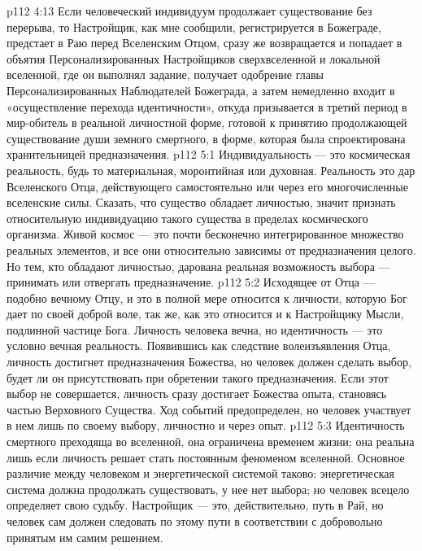 \vs p112 4:13 Если человеческий индивидуум продолжает существование без перерыва, то Настройщик, как мне сообщили, регистрируется в Божеграде, предстает в Раю перед Вселенским Отцом, сразу же возвращается и попадает в объятия Персонализированных Настройщиков сверхвселенной и локальной вселенной, где он выполнял задание, получает одобрение главы Персонализированных Наблюдателей Божеграда, а затем немедленно входит в «осуществление перехода идентичности», откуда призывается в третий период в мир\hyp{}обитель в реальной личностной форме, готовой к принятию продолжающей существование души земного смертного, в форме, которая была спроектирована хранительницей предназначения.
\vs p112 5:1 Индивидуальность --- это космическая реальность, будь то материальная, моронтийная или духовная. Реальность  это дар Вселенского Отца, действующего самостоятельно или через его многочисленные вселенские силы. Сказать, что существо обладает личностью, значит признать относительную индивидуацию такого существа в пределах космического организма. Живой космос --- это почти бесконечно интегрированное множество реальных элементов, и все они относительно зависимы от предназначения целого. Но тем, кто обладают личностью, дарована реальная возможность выбора --- принимать или отвергать предназначение.
\vs p112 5:2 Исходящее от Отца --- подобно вечному Отцу, и это в полной мере относится к личности, которую Бог дает по своей доброй воле, так же, как это относится и к Настройщику Мысли, подлинной частице Бога. Личность человека вечна, но идентичность --- это условно вечная реальность. Появившись как следствие волеизъявления Отца, личность достигнет предназначения Божества, но человек должен сделать выбор, будет ли он присутствовать при обретении такого предназначения. Если этот выбор не совершается, личность сразу достигает Божества опыта, становясь частью Верховного Существа. Ход событий предопределен, но человек участвует в нем лишь по своему выбору, личностно и через опыт.
\vs p112 5:3 \pc Идентичность смертного преходяща во вселенной, она ограничена временем жизни; она реальна лишь если личность решает стать постоянным феноменом вселенной. Основное различие между человеком и энергетической системой таково: энергетическая система должна продолжать существовать, у нее нет выбора; но человек всецело определяет свою судьбу. Настройщик --- это, действительно, путь в Рай, но человек сам должен следовать по этому пути в соответствии с добровольно принятым им самим решением.
